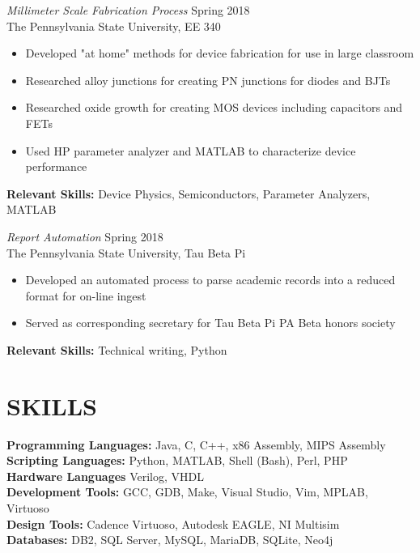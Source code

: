 \documentclass[line,margin]{res}
\begin{document}
\begin{resume}
		{\sl Millimeter Scale Fabrication Process} \hfill Spring 2018\\
		The Pennsylvania State University, EE 340
		\begin{itemize}  \itemsep -2pt
			\item Developed "at home" methods for device fabrication for use in large classroom
			\item Researched alloy junctions for creating PN junctions for diodes and BJTs
			\item Researched oxide growth for creating MOS devices including capacitors and FETs
			\item Used HP parameter analyzer and MATLAB to characterize device performance	
			\vspace*{-\baselineskip}		
		\end{itemize}
		\textbf{Relevant Skills:} Device Physics, Semiconductors, Parameter Analyzers, MATLAB
		
		{\sl Report Automation} \hfill Spring 2018\\
		The Pennsylvania State University, Tau Beta Pi
		\begin{itemize}  \itemsep -2pt
			\item Developed an automated process to parse academic records into a reduced format for on-line ingest
			\item Served as corresponding secretary for Tau Beta Pi PA Beta honors society
			\vspace*{-\baselineskip}		
		\end{itemize}
		\textbf{Relevant Skills:} Technical writing, Python
		
		\section{SKILLS}
		\textbf{Programming Languages:} Java, C, C++, x86 Assembly, MIPS Assembly\\
		\textbf{Scripting Languages:} Python, MATLAB, Shell (Bash), Perl, PHP\\
		\textbf{Hardware Languages} Verilog, VHDL\\
		\textbf{Development Tools:} GCC, GDB, Make, Visual Studio, Vim, MPLAB, Virtuoso\\
		\textbf{Design Tools:} Cadence Virtuoso, Autodesk  EAGLE, NI Multisim\\
		\textbf{Databases:} DB2, SQL Server, MySQL, MariaDB, SQLite, Neo4j
		
	\end{resume}
\end{document}
